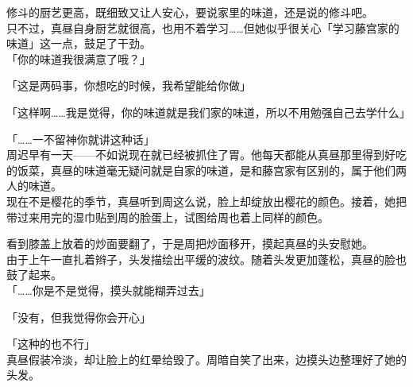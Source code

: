 修斗的厨艺更高，既细致又让人安心，要说家里的味道，还是说的修斗吧。\\

只不过，真昼自身厨艺就很高，也用不着学习……但她似乎很关心「学习藤宫家的味道」这一点，鼓足了干劲。\\

「你的味道我很满意了哦？」

「这是两码事，你想吃的时候，我希望能给你做」

「这样啊……我是觉得，你的味道就是我们家的味道，所以不用勉强自己去学什么」

「……一不留神你就讲这种话」\\

周迟早有一天——不如说现在就已经被抓住了胃。他每天都能从真昼那里得到好吃的饭菜，真昼的味道毫无疑问就是自家的味道，是和藤宫家有区别的，属于他们两人的味道。\\

现在不是樱花的季节，真昼听到周这么说，脸上却绽放出樱花的颜色。接着，她把带过来用完的湿巾贴到周的脸蛋上，试图给周也着上同样的颜色。

看到膝盖上放着的炒面要翻了，于是周把炒面移开，摸起真昼的头安慰她。\\

由于上午一直扎着辫子，头发描绘出平缓的波纹。随着头发更加蓬松，真昼的脸也鼓了起来。\\

「……你是不是觉得，摸头就能糊弄过去」

「没有，但我觉得你会开心」

「这种的也不行」\\

真昼假装冷淡，却让脸上的红晕给毁了。周暗自笑了出来，边摸头边整理好了她的头发。
